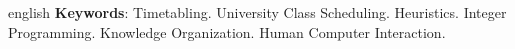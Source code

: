 \begin{resumo}[Abstract]
\begin{otherlanguage*}{english}
    \textbf{Keywords}: Timetabling. University Class Scheduling. Heuristics. Integer Programming. Knowledge Organization. Human Computer Interaction.

  \end{otherlanguage*}


\end{resumo}